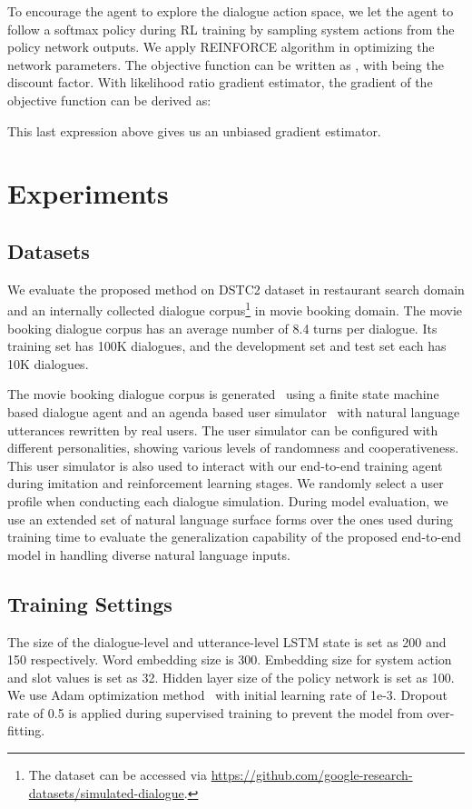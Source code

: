 \documentclass[11pt,a4paper]{article}
\begin{document}
    To encourage the agent to explore the dialogue action space, we let the agent to follow a softmax policy during RL training by sampling system actions from the policy network outputs. We apply REINFORCE algorithm \cite{williams1992simple} in optimizing the network parameters. The objective function can be written as , with  being the discount factor. With likelihood ratio gradient estimator, the gradient of the objective function can be derived as:
        
    This last expression above gives us an unbiased gradient estimator. 

\section{Experiments}
\subsection{Datasets}
    We evaluate the proposed method on DSTC2 \cite{henderson2014second} dataset in restaurant search domain and an internally collected dialogue corpus\footnote{The dataset can be accessed via \url{https://github.com/google-research-datasets/simulated-dialogue}.} in movie booking domain. The movie booking dialogue corpus has an average number of 8.4 turns per dialogue. Its training set has 100K dialogues, and the development set and test set each has 10K dialogues. 
    
    The movie booking dialogue corpus is generated~\cite{shah2018bootstrapping} using a finite state machine based dialogue agent and an agenda based user simulator~\cite{schatzmann2007agenda} with natural language utterances rewritten by real users. The user simulator can be configured with different personalities, showing various levels of randomness and cooperativeness. This user simulator is also used to interact with our end-to-end training agent during imitation and reinforcement learning stages. We randomly select a user profile when conducting each dialogue simulation. During model evaluation, we use an extended set of natural language surface forms over the ones used during training time to evaluate the generalization capability of the proposed end-to-end model in handling diverse natural language inputs.
    
\subsection{Training Settings}
    The size of the dialogue-level and utterance-level LSTM state is set as 200 and 150 respectively. Word embedding size is 300. Embedding size for system action and slot values is set as 32. Hidden layer size of the policy network is set as 100. We use Adam optimization method~\cite{kingma2014adam} with initial learning rate of 1e-3. Dropout rate of 0.5 is applied during supervised training to prevent the model from over-fitting. 
    
\end{document}
